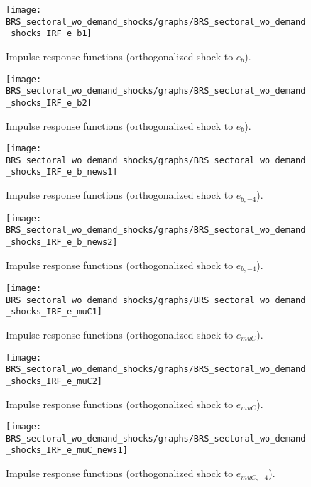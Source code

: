 \begin{figure}[H]
\centering 
\texttt{[image: BRS\_sectoral\_wo\_demand\_shocks/graphs/BRS\_sectoral\_wo\_demand\_shocks\_IRF\_e\_b1]}
\caption{Impulse response functions (orthogonalized shock to ${e_b}$).}\label{Fig:IRF:e_b:1}
\end{figure}
 
\begin{figure}[H]
\centering 
\texttt{[image: BRS\_sectoral\_wo\_demand\_shocks/graphs/BRS\_sectoral\_wo\_demand\_shocks\_IRF\_e\_b2]}
\caption{Impulse response functions (orthogonalized shock to ${e_b}$).}\label{Fig:IRF:e_b:2}
\end{figure}
 
\begin{figure}[H]
\centering 
\texttt{[image: BRS\_sectoral\_wo\_demand\_shocks/graphs/BRS\_sectoral\_wo\_demand\_shocks\_IRF\_e\_b\_news1]}
\caption{Impulse response functions (orthogonalized shock to ${e_{b,-4}}$).}\label{Fig:IRF:e_b_news:1}
\end{figure}
 
\begin{figure}[H]
\centering 
\texttt{[image: BRS\_sectoral\_wo\_demand\_shocks/graphs/BRS\_sectoral\_wo\_demand\_shocks\_IRF\_e\_b\_news2]}
\caption{Impulse response functions (orthogonalized shock to ${e_{b,-4}}$).}\label{Fig:IRF:e_b_news:2}
\end{figure}
 
\begin{figure}[H]
\centering 
\texttt{[image: BRS\_sectoral\_wo\_demand\_shocks/graphs/BRS\_sectoral\_wo\_demand\_shocks\_IRF\_e\_muC1]}
\caption{Impulse response functions (orthogonalized shock to ${e_{muC}}$).}\label{Fig:IRF:e_muC:1}
\end{figure}
 
\begin{figure}[H]
\centering 
\texttt{[image: BRS\_sectoral\_wo\_demand\_shocks/graphs/BRS\_sectoral\_wo\_demand\_shocks\_IRF\_e\_muC2]}
\caption{Impulse response functions (orthogonalized shock to ${e_{muC}}$).}\label{Fig:IRF:e_muC:2}
\end{figure}
 
\begin{figure}[H]
\centering 
\texttt{[image: BRS\_sectoral\_wo\_demand\_shocks/graphs/BRS\_sectoral\_wo\_demand\_shocks\_IRF\_e\_muC\_news1]}
\caption{Impulse response functions (orthogonalized shock to ${e_{muC,-4}}$).}\label{Fig:IRF:e_muC_news:1}
\end{figure}
 

